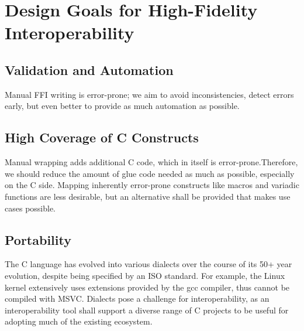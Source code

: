 \section{Design Goals for High-Fidelity Interoperability}
\label{sec:desirable_properties}

\subsection{Validation and Automation}
Manual FFI writing is error-prone; we aim to avoid inconsistencies, detect errors early, but even better to provide as much automation as possible.

\subsection{High Coverage of C Constructs}

Manual wrapping adds additional C code, which in itself is error-prone.Therefore, we should reduce the amount of glue code needed as much as possible, especially on the C side. Mapping inherently error-prone constructs like macros and variadic functions are less desirable, but an alternative shall be provided that makes use cases possible.


\subsection{Portability}

The C language has evolved into various dialects over the course of its 50+ year evolution, despite being specified by an ISO standard. For example, the Linux kernel extensively uses extensions provided by the gcc compiler, thus cannot be compiled with MSVC. Dialects pose a challenge for interoperability, as an interoperability tool shall support a diverse range of C projects to be useful for adopting much of the existing ecosystem.

